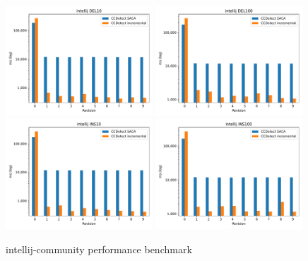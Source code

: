 \vfill

\newpage
\null
\vfill

\begin{figure}[H]
    \begin{center}
        \includegraphics[width=0.49\textwidth]{figures/performancegraphs/intellij_DEL10.pdf}
        \includegraphics[width=0.49\textwidth]{figures/performancegraphs/intellij_DEL100.pdf}
        \includegraphics[width=0.49\textwidth]{figures/performancegraphs/intellij_INS10.pdf}
        \includegraphics[width=0.49\textwidth]{figures/performancegraphs/intellij_INS100.pdf}
    \end{center}
    \caption{intellij-community performance benchmark}
    \label{fig:intellij}
\end{figure}

